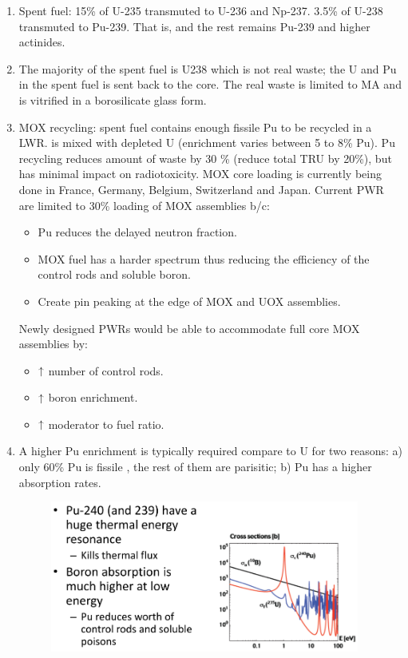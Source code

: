\documentclass{school-22.211-notes}
\begin{document}
\begin{enumerate}

\item Spent fuel: 15\% of U-235 transmuted to U-236 and Np-237. 3.5\%
  of U-238 transmuted to Pu-239. That is,  and the
  rest remains Pu-239 and higher actinides.

\item The majority of the spent fuel is U238 which is not real waste;
  the U and Pu in the spent fuel is sent back to the core. The real
  waste is limited to MA and is vitrified in a borosilicate glass
  form.

\item MOX recycling: spent fuel contains enough fissile Pu to be
  recycled in a LWR.  is mixed with depleted U (enrichment
  varies between 5 to 8\% Pu). Pu recycling reduces amount of waste by
  30 \% (reduce total TRU by 20\%), but has minimal impact on
  radiotoxicity. MOX core loading is currently being done in France,
  Germany, Belgium, Switzerland and Japan. Current PWR are limited to
  30\% loading of MOX assemblies b/c:
  \begin{itemize}
    \item Pu reduces the delayed neutron fraction. 
    \item MOX fuel has a harder spectrum thus reducing the efficiency
      of the control rods and soluble boron.
    \item Create pin peaking at the edge of MOX and UOX assemblies.
  \end{itemize}
  Newly designed PWRs would be able to accommodate full core MOX
  assemblies by:
  \begin{itemize}
    \item $\uparrow$ number of control rods. 
    \item $\uparrow$ boron enrichment. 
    \item $\uparrow$ moderator to fuel ratio. 
  \end{itemize}

\item A higher Pu enrichment is typically required compare to U for
  two reasons: a) only 60\% Pu is fissile , the rest of
  them are parisitic; b) Pu has a higher absorption rates.
  \begin{figure}[h]
    \centering
    \includegraphics[width=4in]{images/dfs/Pu-fuel.png}
  \end{figure}



\end{enumerate}
\end{document}
